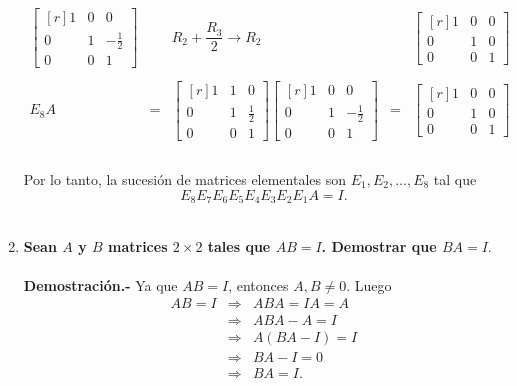 \begin{enumerate}
    $$\begin{array}{rcccc}
	\begin{bmatrix*}[r]
	    1 & 0 & 0\\
	    0 & 1 & -\frac{1}{2}\\
	    0 & 0 & 1 
	\end{bmatrix*} && R_2+\dfrac{R_3}{2}\to R_2 & &
	\begin{bmatrix*}[r]
	    1 & 0 & 0\\
	    0 & 1 & 0\\
	    0 & 0 & 1 
	\end{bmatrix*} \\\\
	E_8A&=&\begin{bmatrix*}[r]
	    1 & 1 & 0\\
	    0 & 1 & \frac{1}{2}\\
	    0 & 0 & 1 
	\end{bmatrix*} 
	\begin{bmatrix*}[r]
	    1 & 0 & 0\\
	    0 & 1 & -\frac{1}{2}\\
	    0 & 0 & 1 
	\end{bmatrix*} &=& 
	\begin{bmatrix*}[r]
	    1 & 0 & 0\\
	    0 & 1 & 0\\
	    0 & 0 & 1 
	\end{bmatrix*} \\\\
    \end{array}$$

    Por lo tanto, la sucesión de matrices elementales son $E_1,E_2,\ldots , E_8$ tal que
    $$E_8 E_7 E_6 E_5 E_4 E_3 E_2 E_1 A = I.$$\\

    \item \textbf{\boldmath Sean $A$ y $B$ matrices $2\times 2$ tales que $AB=I$. Demostrar que $BA=I.$\\\\
	Demostración.-}\; Ya que $AB=I$, entonces $A,B\neq 0.$ Luego
	$$\begin{array}{rcl}
	    AB=I &\Rightarrow & ABA = IA = A\\
		 &\Rightarrow & ABA-A = I\\
		 &\Rightarrow & A(BA-I) = I\\
		 &\Rightarrow & BA-I = 0\\	
		 &\Rightarrow & BA = I.
	\end{array}$$
	\vspace{0.5cm}


\end{enumerate}
